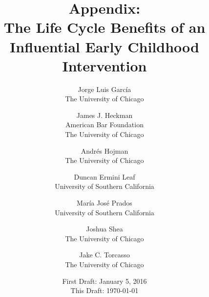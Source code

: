 





\title{\Large \textbf{Appendix: \\ The Life Cycle Benefits of an Influential Early Childhood Intervention}}

\author{
Jorge Luis Garc\'{i}a\\
The University of Chicago \and
James J. Heckman \\
American Bar Foundation \\
The University of Chicago \and
Andr\'{e}s Hojman\\
The University of Chicago \and
Duncan Ermini Leaf \\
University of Southern California \and
Mar\'{i}a Jos\'{e} Prados \\
University of Southern California \and
Joshua Shea \\
The University of Chicago \and
Jake C. Torcasso \\
The University of Chicago}
\date{First Draft: January 5, 2016\\ This Draft: \today}
\maketitle
\thispagestyle{empty}

\clearpage

\tableofcontents
\listoffigures
\listoftables
\pagebreak
\doublespacing

